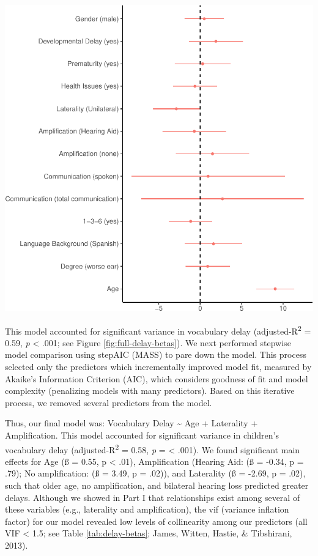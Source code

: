 \documentclass[english,man]{apa6}
\begin{document}
\includegraphics{ELSSP_paper_files/figure-latex/full-delay-betas-1.pdf}

This model accounted for significant variance in vocabulary delay (adjusted-R\textsuperscript{2} = 0.59, \emph{p} \textless{} .001; see Figure \ref{fig:full-delay-betas}). We next performed stepwise model comparison using stepAIC (MASS) to pare down the model. This process selected only the predictors which incrementally improved model fit, measured by Akaike's Information Criterion (AIC), which considers goodness of fit and model complexity (penalizing models with many predictors). Based on this iterative process, we removed several predictors from the model.

Thus, our final model was: Vocabulary Delay \textasciitilde{} Age + Laterality + Amplification. This model accounted for significant variance in children's vocabulary delay (adjusted-R\textsuperscript{2} = 0.58, \emph{p} = \textless{} .001). We found significant main effects for Age (ß = 0.55, p \textless{} .01), Amplification (Hearing Aid: (ß = -0.34, p = .79); No amplification: (ß = 3.49, p = .02)), and Laterality (ß = -2.69, p = .02), such that older age, no amplification, and bilateral hearing loss predicted greater delays. Although we showed in Part I that relationships exist among several of these variables (e.g., laterality and amplification), the vif (variance inflation factor) for our model revealed low levels of collinearity among our predictors (all VIF \textless{} 1.5; see Table \ref{tab:delay-betas}; James, Witten, Hastie, \& Tibshirani, 2013).
\end{document}
